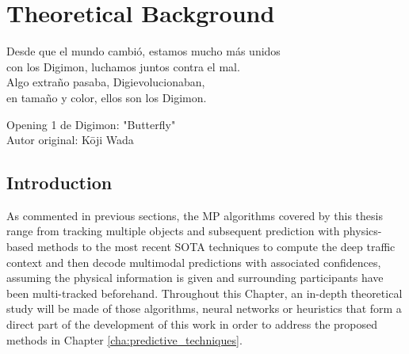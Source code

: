 % 
% 
% 
% 
% 
% 
% 

\chapter{Theoretical Background}
\label{cha:theoretical_background}

\begin{FraseCelebre}
	\begin{Frase}
		Desde que el mundo cambió, estamos mucho más unidos \\
		con los Digimon, luchamos juntos contra el mal. \\ 

		Algo extraño pasaba, Digievolucionaban, \\
		en tamaño y color, ellos son los Digimon. \\
	\end{Frase}
	\begin{Fuente}
		Opening 1 de Digimon: "Butterfly" \\
		Autor original: Kōji Wada
	\end{Fuente}
\end{FraseCelebre}

\section{Introduction}
\label{sec:3_introduction}

As commented in previous sections, the \ac{MP} algorithms covered by this thesis range from tracking multiple objects and subsequent prediction with physics-based methods to the most recent \ac{SOTA} techniques to compute the deep traffic context and then decode multimodal predictions with associated confidences, assuming the physical information is given and surrounding participants have been multi-tracked beforehand. Throughout this Chapter, an in-depth theoretical study will be made of those algorithms, neural networks or heuristics that form a direct part of the development of this work in order to address the proposed methods in Chapter \ref{cha:predictive_techniques}. \\

